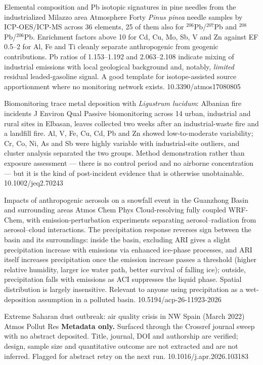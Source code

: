 \documentclass[10pt]{article}
\begin{document}
{Elemental composition and Pb isotopic signatures in pine needles from the industrialized Milazzo area}
{Atmosphere}
{Forty \textit{Pinus pinea} needle samples by ICP-OES/ICP-MS across 36 elements, 25 of
them also for $^{206}$Pb/$^{207}$Pb and $^{208}$Pb/$^{206}$Pb. Enrichment factors above
10 for Cd, Cu, Mo, Sb, V and Zn against EF 0.5--2 for Al, Fe and Ti cleanly separate
anthropogenic from geogenic contributions. Pb ratios of 1.153--1.192 and 2.063--2.108
indicate mixing of industrial emissions with local geological background and, notably,
\emph{limited} residual leaded-gasoline signal. A good template for isotope-assisted
source apportionment where no monitoring network exists.}
{10.3390/atmos17080805}

{Biomonitoring trace metal deposition with \textit{Ligustrum lucidum}: Albanian fire incidents}
{J Environ Qual}
{Passive biomonitoring across 14 urban, industrial and rural sites in Elbasan, leaves
collected two weeks after an industrial-waste fire and a landfill fire. Al, V, Fe, Cu,
Cd, Pb and Zn showed low-to-moderate variability; Cr, Co, Ni, As and Sb were highly
variable with industrial-site outliers, and cluster analysis separated the two groups.
Method demonstration rather than exposure assessment --- there is no control period and
no airborne concentration --- but it is the kind of post-incident evidence that is
otherwise unobtainable.}
{10.1002/jeq2.70243}

{Impacts of anthropogenic aerosols on a snowfall event in the Guanzhong Basin and surrounding areas}
{Atmos Chem Phys}
{Cloud-resolving fully coupled WRF-Chem, with emission-perturbation experiments
separating aerosol--radiation from aerosol--cloud interactions. The precipitation
response reverses sign between the basin and its surroundings: inside the basin,
excluding ARI gives a slight precipitation increase with emissions via enhanced
ice-phase processes, and ARI itself increases precipitation once the emission increase
passes a threshold (higher relative humidity, larger ice water path, better survival of
falling ice); outside, precipitation falls with emissions as ACI suppresses the liquid
phase. Spatial distribution is largely insensitive. Relevant to anyone using
precipitation as a wet-deposition assumption in a polluted basin.}
{10.5194/acp-26-11923-2026}

{Extreme Saharan dust outbreak: air quality crisis in NW Spain (March 2022)}
{Atmos Pollut Res}
{\textbf{Metadata only.} Surfaced through the Crossref journal sweep with no abstract
deposited. Title, journal, DOI and authorship are verified; design, sample size and
quantitative outcome are not extracted and are not inferred. Flagged for abstract
retry on the next run.}
{10.1016/j.apr.2026.103183}
\end{document}
